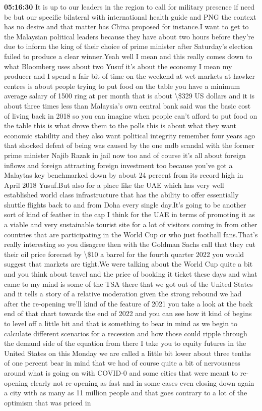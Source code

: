 \documentclass{article}%
\begin{document}
\textbf{05:16:30}%
\newline%
It is up to our leaders in the region to call for military presence if need be but our specific bilateral with international health guide and PNG the context has no desire and that matter has China proposed for instance.I want to get to the Malaysian political leaders because they have about two hours before they're due to inform the king of their choice of prime minister after Saturday's election failed to produce a clear winner.Yeah well I mean and this really comes down to what Bloomberg uses about two Yusuf it's about the economy I mean my producer and I spend a fair bit of time on the weekend at wet markets at hawker centres is about people trying to put food on the table you have a minimum average salary of 1500 ring at per month that is about \textbackslash{}\$329 US dollars and it is about three times less than Malaysia's own central bank said was the basic cost of living back in 2018 so you can imagine when people can't afford to put food on the table this is what drove them to the polls this is about what they want economic stability and they also want political integrity remember four years ago that shocked defeat of being was caused by the one mdb scandal with the former prime minister Najib Razak in jail now too and of course it's all about foreign inflows and foreign attracting foreign investment too because you've got a Malaytas key benchmarked down by about 24 percent from its record high in April 2018 Yusuf.But also for a place like the UAE which has very well established world class infrastructure that has the ability to offer essentially shuttle flights back to and from Doha every single day.It's going to be another sort of kind of feather in the cap I think for the UAE in terms of promoting it as a viable and very sustainable tourist site for a lot of visitors coming in from other countries that are participating in the World Cup or who just football fans.That's really interesting so you disagree then with the Goldman Sachs call that they cut their oil price forecast by \textbackslash{}\$10 a barrel for the fourth quarter 2022 you would suggest that markets are tight.We were talking about the World Cup quite a bit and you think about travel and the price of booking it ticket these days and what came to my mind is some of the TSA there that we got out of the United States and it tells a story of a relative moderation given the strong rebound we had after the re{-}opening we'll kind of the feature of 2021 you take a look at the back end of that chart towards the end of 2022 and you can see how it kind of begins to level off a little bit and that is something to bear in mind as we begin to calculate different scenarios for a recession and how those could ripple through the demand side of the equation from there I take you to equity futures in the United States on this Monday we are called a little bit lower about three tenths of one percent bear in mind that we had of course quite a bit of nervousness around what is going on with COVID{-}0 and some cities that were meant to re{-}opening clearly not re{-}opening as fast and in some cases even closing down again a city with as many as 11 million people and that goes contrary to a lot of the optimism that was priced in 
\end{document}
